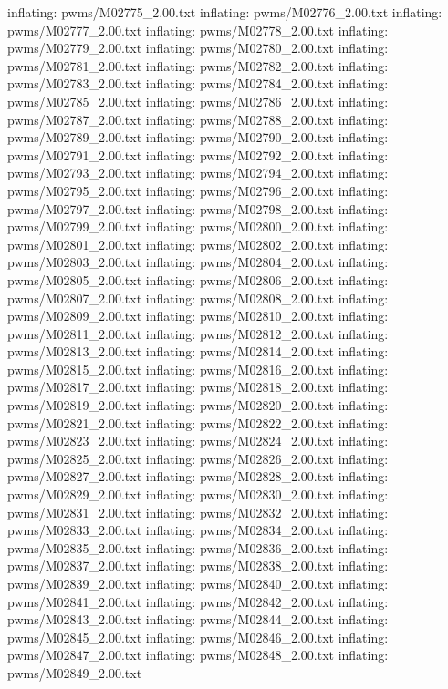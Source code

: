 \documentclass[letterpaper,10pt,english]{sphinxmanual}
\begin{document}
{\begin{sphinxVerbatim}[commandchars=\\\{\}]
  inflating: pwms/M02775\_2.00.txt
  inflating: pwms/M02776\_2.00.txt
  inflating: pwms/M02777\_2.00.txt
  inflating: pwms/M02778\_2.00.txt
  inflating: pwms/M02779\_2.00.txt
  inflating: pwms/M02780\_2.00.txt
  inflating: pwms/M02781\_2.00.txt
  inflating: pwms/M02782\_2.00.txt
  inflating: pwms/M02783\_2.00.txt
  inflating: pwms/M02784\_2.00.txt
  inflating: pwms/M02785\_2.00.txt
  inflating: pwms/M02786\_2.00.txt
  inflating: pwms/M02787\_2.00.txt
  inflating: pwms/M02788\_2.00.txt
  inflating: pwms/M02789\_2.00.txt
  inflating: pwms/M02790\_2.00.txt
  inflating: pwms/M02791\_2.00.txt
  inflating: pwms/M02792\_2.00.txt
  inflating: pwms/M02793\_2.00.txt
  inflating: pwms/M02794\_2.00.txt
  inflating: pwms/M02795\_2.00.txt
  inflating: pwms/M02796\_2.00.txt
  inflating: pwms/M02797\_2.00.txt
  inflating: pwms/M02798\_2.00.txt
  inflating: pwms/M02799\_2.00.txt
  inflating: pwms/M02800\_2.00.txt
  inflating: pwms/M02801\_2.00.txt
  inflating: pwms/M02802\_2.00.txt
  inflating: pwms/M02803\_2.00.txt
  inflating: pwms/M02804\_2.00.txt
  inflating: pwms/M02805\_2.00.txt
  inflating: pwms/M02806\_2.00.txt
  inflating: pwms/M02807\_2.00.txt
  inflating: pwms/M02808\_2.00.txt
  inflating: pwms/M02809\_2.00.txt
  inflating: pwms/M02810\_2.00.txt
  inflating: pwms/M02811\_2.00.txt
  inflating: pwms/M02812\_2.00.txt
  inflating: pwms/M02813\_2.00.txt
  inflating: pwms/M02814\_2.00.txt
  inflating: pwms/M02815\_2.00.txt
  inflating: pwms/M02816\_2.00.txt
  inflating: pwms/M02817\_2.00.txt
  inflating: pwms/M02818\_2.00.txt
  inflating: pwms/M02819\_2.00.txt
  inflating: pwms/M02820\_2.00.txt
  inflating: pwms/M02821\_2.00.txt
  inflating: pwms/M02822\_2.00.txt
  inflating: pwms/M02823\_2.00.txt
  inflating: pwms/M02824\_2.00.txt
  inflating: pwms/M02825\_2.00.txt
  inflating: pwms/M02826\_2.00.txt
  inflating: pwms/M02827\_2.00.txt
  inflating: pwms/M02828\_2.00.txt
  inflating: pwms/M02829\_2.00.txt
  inflating: pwms/M02830\_2.00.txt
  inflating: pwms/M02831\_2.00.txt
  inflating: pwms/M02832\_2.00.txt
  inflating: pwms/M02833\_2.00.txt
  inflating: pwms/M02834\_2.00.txt
  inflating: pwms/M02835\_2.00.txt
  inflating: pwms/M02836\_2.00.txt
  inflating: pwms/M02837\_2.00.txt
  inflating: pwms/M02838\_2.00.txt
  inflating: pwms/M02839\_2.00.txt
  inflating: pwms/M02840\_2.00.txt
  inflating: pwms/M02841\_2.00.txt
  inflating: pwms/M02842\_2.00.txt
  inflating: pwms/M02843\_2.00.txt
  inflating: pwms/M02844\_2.00.txt
  inflating: pwms/M02845\_2.00.txt
  inflating: pwms/M02846\_2.00.txt
  inflating: pwms/M02847\_2.00.txt
  inflating: pwms/M02848\_2.00.txt
  inflating: pwms/M02849\_2.00.txt

\end{sphinxVerbatim}}
\end{document}
